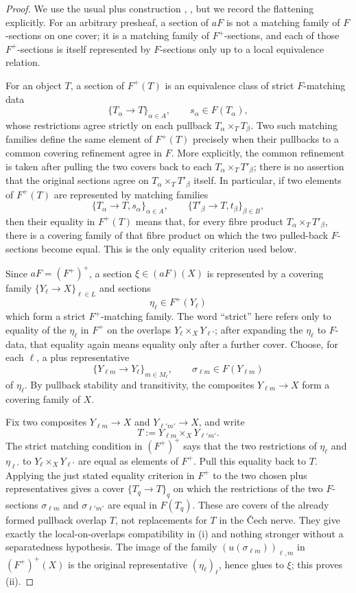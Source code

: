 \begin{proof}
We use the usual plus construction
\cite[III.5]{MacLaneMoerdijk1994}, \cite[Tags 00W1, 00WK]{StacksProject},
but we record the flattening explicitly. For an arbitrary presheaf, a
section of \(aF\) is not a matching family of \(F\)-sections on one cover;
it is a matching family of \(F^+\)-sections, and each of those
\(F^+\)-sections is itself represented by \(F\)-sections only up to a
local equivalence relation.

For an object \(T\), a section of \(F^+(T)\) is an equivalence class of
strict \(F\)-matching data
\[
\{T_\alpha\to T\}_{\alpha\in A},
\qquad
s_\alpha\in F(T_\alpha),
\]
whose restrictions agree strictly on each pullback
\(T_\alpha\times_T T_\beta\). Two such matching families define the same
element of \(F^+(T)\) precisely when their pullbacks to a common covering
refinement agree in \(F\). More explicitly, the common refinement is taken
after pulling the two covers back to each \(T_\alpha\times_TT'_\beta\);
there is no assertion that the original sections agree on
\(T_\alpha\times_TT'_\beta\) itself. In particular, if two elements of
\(F^+(T)\) are
represented by matching families
\[
\{T_\alpha\to T,s_\alpha\}_{\alpha\in A},
\qquad
\{T'_\beta\to T,t_\beta\}_{\beta\in B},
\]
then their equality in $F^+(T)$ means that, for every fibre product
$T_\alpha\times_TT'_\beta$, there is a covering family of that fibre
product on which the two pulled-back $F$-sections become equal. This is
the only equality criterion used below.

Since \(aF=(F^+)^+\), a section \(\xi\in(aF)(X)\) is represented by a
covering family
$\{Y_\ell\to X\}_{\ell\in L}$ and sections
\[
\eta_\ell\in F^+(Y_\ell)
\]
which form a strict \(F^+\)-matching family. The word ``strict'' here
refers only to equality of the \(\eta_\ell\) in \(F^+\) on the overlaps
\(Y_\ell\times_XY_{\ell'}\); after expanding the \(\eta_\ell\) to
\(F\)-data, that equality again means equality only after a further cover.
Choose, for each $\ell$, a
plus representative
\[
\{Y_{\ell m}\to Y_\ell\}_{m\in M_\ell},
\qquad
\sigma_{\ell m}\in F(Y_{\ell m})
\]
of $\eta_\ell$. By pullback stability and transitivity, the composites
$Y_{\ell m}\to X$ form a covering family of $X$.

Fix two composites $Y_{\ell m}\to X$ and $Y_{\ell' m'}\to X$, and write
\[
T:=Y_{\ell m}\times_XY_{\ell' m'}.
\]
The strict matching condition in \((F^+)^+\) says that the two restrictions
of \(\eta_\ell\) and \(\eta_{\ell'}\) to
\(Y_\ell\times_XY_{\ell'}\) are equal as elements of \(F^+\). Pull this
equality back to \(T\). Applying the just stated equality criterion in
\(F^+\) to the two chosen plus representatives gives a cover
$\{T_q\to T\}_q$ on which the restrictions of the two $F$-sections
$\sigma_{\ell m}$ and $\sigma_{\ell' m'}$ are equal in $F(T_q)$. These
are covers of the already formed pullback overlap \(T\), not replacements
for \(T\) in the \v{C}ech nerve. They give exactly the local-on-overlaps
compatibility in \textup{(i)} and nothing stronger without a separatedness
hypothesis. The image of the family
$(u(\sigma_{\ell m}))_{\ell,m}$ in $(F^+)^+(X)$ is the original
representative $(\eta_\ell)_\ell$, hence glues to $\xi$; this proves
\textup{(ii)}.


\end{proof}

